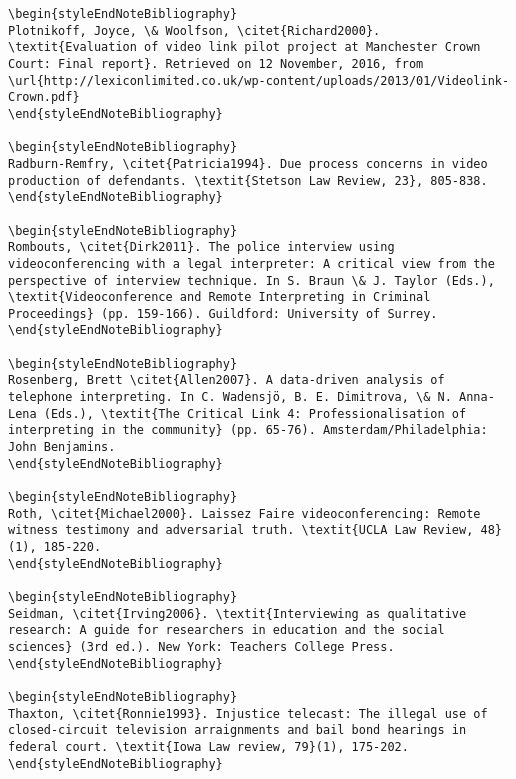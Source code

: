 \documentclass[output=paper]{langsci/langscibook}
\begin{document}
\begin{verbatim}
\begin{styleEndNoteBibliography}
Plotnikoff, Joyce, \& Woolfson, \citet{Richard2000}. \textit{Evaluation of video link pilot project at Manchester Crown Court: Final report}. Retrieved on 12 November, 2016, from \url{http://lexiconlimited.co.uk/wp-content/uploads/2013/01/Videolink-Crown.pdf}
\end{styleEndNoteBibliography}

\begin{styleEndNoteBibliography}
Radburn-Remfry, \citet{Patricia1994}. Due process concerns in video production of defendants. \textit{Stetson Law Review, 23}, 805-838. 
\end{styleEndNoteBibliography}

\begin{styleEndNoteBibliography}
Rombouts, \citet{Dirk2011}. The police interview using videoconferencing with a legal interpreter: A critical view from the perspective of interview technique. In S. Braun \& J. Taylor (Eds.), \textit{Videoconference and Remote Interpreting in Criminal Proceedings} (pp. 159-166). Guildford: University of Surrey.
\end{styleEndNoteBibliography}

\begin{styleEndNoteBibliography}
Rosenberg, Brett \citet{Allen2007}. A data-driven analysis of telephone interpreting. In C. Wadensjö, B. E. Dimitrova, \& N. Anna-Lena (Eds.), \textit{The Critical Link 4: Professionalisation of interpreting in the community} (pp. 65-76). Amsterdam/Philadelphia: John Benjamins.
\end{styleEndNoteBibliography}

\begin{styleEndNoteBibliography}
Roth, \citet{Michael2000}. Laissez Faire videoconferencing: Remote witness testimony and adversarial truth. \textit{UCLA Law Review, 48}(1), 185-220. 
\end{styleEndNoteBibliography}

\begin{styleEndNoteBibliography}
Seidman, \citet{Irving2006}. \textit{Interviewing as qualitative research: A guide for researchers in education and the social sciences} (3rd ed.). New York: Teachers College Press.
\end{styleEndNoteBibliography}

\begin{styleEndNoteBibliography}
Thaxton, \citet{Ronnie1993}. Injustice telecast: The illegal use of closed-circuit television arraignments and bail bond hearings in federal court. \textit{Iowa Law review, 79}(1), 175-202. 
\end{styleEndNoteBibliography}


\end{verbatim}
\end{document}
